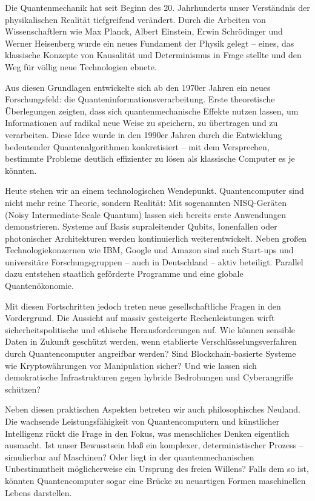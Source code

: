 \preface

Die Quantenmechanik hat seit Beginn des 20. Jahrhunderts unser Verständnis der physikalischen Realität tiefgreifend verändert. Durch die Arbeiten von Wissenschaftlern wie Max Planck, Albert Einstein, Erwin Schrödinger und Werner Heisenberg wurde ein neues Fundament der Physik gelegt – eines, das klassische Konzepte von Kausalität und Determinismus in Frage stellte und den Weg für völlig neue Technologien ebnete.

Aus diesen Grundlagen entwickelte sich ab den 1970er Jahren ein neues Forschungsfeld: die Quanteninformationsverarbeitung. Erste theoretische Überlegungen zeigten, dass sich quantenmechanische Effekte nutzen lassen, um Informationen auf radikal neue Weise zu speichern, zu übertragen und zu verarbeiten. Diese Idee wurde in den 1990er Jahren durch die Entwicklung bedeutender Quantenalgorithmen konkretisiert – mit dem Versprechen, bestimmte Probleme deutlich effizienter zu lösen als klassische Computer es je könnten.

Heute stehen wir an einem technologischen Wendepunkt. Quantencomputer sind nicht mehr reine Theorie, sondern Realität: Mit sogenannten NISQ-Geräten (Noisy Intermediate-Scale Quantum) lassen sich bereits erste Anwendungen demonstrieren. Systeme auf Basis supraleitender Qubits, Ionenfallen oder photonischer Architekturen werden kontinuierlich weiterentwickelt. Neben großen Technologiekonzernen wie IBM, Google und Amazon sind auch Start-ups und universitäre Forschungsgruppen – auch in Deutschland – aktiv beteiligt. Parallel dazu entstehen staatlich geförderte Programme und eine globale Quantenökonomie.

Mit diesen Fortschritten jedoch treten neue gesellschaftliche Fragen in den Vordergrund. Die Aussicht auf massiv gesteigerte Rechenleistungen wirft sicherheitspolitische und ethische Herausforderungen auf. Wie können sensible Daten in Zukunft geschützt werden, wenn etablierte Verschlüsselungsverfahren durch Quantencomputer angreifbar werden? Sind Blockchain-basierte Systeme wie Kryptowährungen vor Manipulation sicher? Und wie lassen sich demokratische Infrastrukturen gegen hybride Bedrohungen und Cyberangriffe schützen?

Neben diesen praktischen Aspekten betreten wir auch philosophisches Neuland. Die wachsende Leistungsfähigkeit von Quantencomputern und künstlicher Intelligenz rückt die Frage in den Fokus, was menschliches Denken eigentlich ausmacht. Ist unser Bewusstsein bloß ein komplexer, deterministischer Prozess – simulierbar auf Maschinen? Oder liegt in der quantenmechanischen Unbestimmtheit möglicherweise ein Ursprung des freien Willens? Falls dem so ist, könnten Quantencomputer sogar eine Brücke zu neuartigen Formen maschinellen Lebens darstellen.

